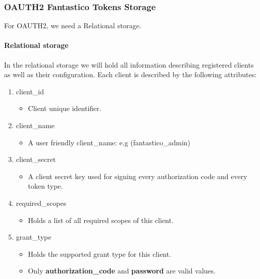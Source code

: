 \documentclass[letterpaper,10pt,english]{sphinxmanual}
\begin{document}
\subsubsection{OAUTH2 Fantastico Tokens Storage}
\label{features/oauth2/tokens_storage::doc}\label{features/oauth2/tokens_storage:oauth2-fantastico-tokens-storage}
For OAUTH2, we need a Relational storage.


\paragraph{Relational storage}
\label{features/oauth2/tokens_storage:relational-storage}
In the relational storage we will hold all information describing registered clients as well as their configuration. Each client
is described by the following attributes:
\begin{enumerate}
\item {} 
client\_id
\begin{itemize}
\item {} 
Client unique identifier.

\end{itemize}

\item {} 
client\_name
\begin{itemize}
\item {} 
A user friendly client\_name: e.g (fantastico\_admin)

\end{itemize}

\item {} 
client\_secret
\begin{itemize}
\item {} 
A client secret key used for signing every authorization code and every token type.

\end{itemize}

\item {} 
required\_scopes
\begin{itemize}
\item {} 
Holds a list of all required scopes of this client.

\end{itemize}

\item {} 
grant\_type
\begin{itemize}
\item {} 
Holds the supported grant type for this client.

\item {} 
Only \textbf{authorization\_code} and \textbf{password} are valid values.


\end{itemize}
\end{enumerate}
\end{document}
